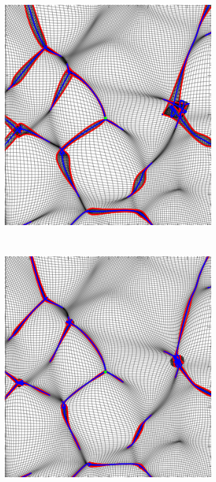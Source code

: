 \documentclass[a4paper, 11pt]{article}
\begin{document}
\begin{figure}
\begin{subfigure}[b]{0.28\textwidth}
\end{subfigure}~
\begin{subfigure}[b]{0.28\textwidth}
\includegraphics[width=\textwidth]{Swallowtail_Z}
\end{subfigure}~
\begin{subfigure}[b]{0.28\textwidth}
\includegraphics[width=\textwidth]{Swallowtail_Nb}

\end{subfigure}
\end{figure}
\end{document}
